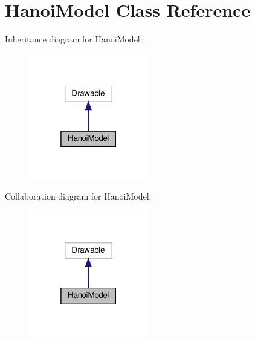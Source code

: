 \hypertarget{class_hanoi_model}{}\section{Hanoi\+Model Class Reference}
\label{class_hanoi_model}


Inheritance diagram for Hanoi\+Model\+:\nopagebreak
\begin{figure}[H]
\begin{center}
\leavevmode
\includegraphics[width=148pt]{class_hanoi_model__inherit__graph}
\end{center}
\end{figure}


Collaboration diagram for Hanoi\+Model\+:\nopagebreak
\begin{figure}[H]
\begin{center}
\leavevmode
\includegraphics[width=148pt]{class_hanoi_model__coll__graph}
\end{center}
\end{figure}
